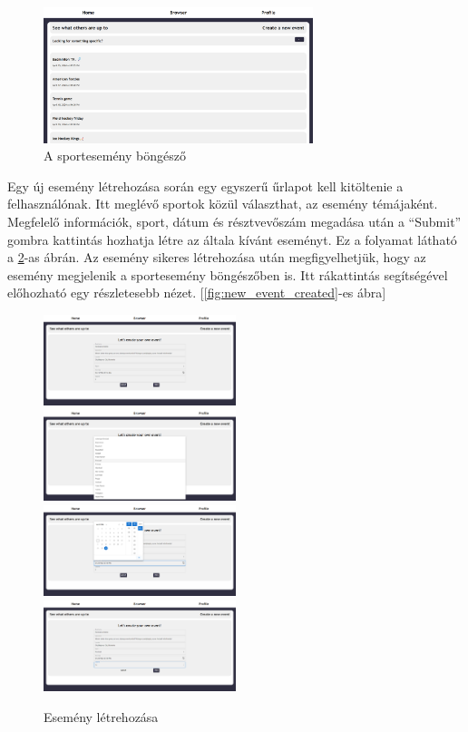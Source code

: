 \begin{figure}[ht]
	\centering
	\includegraphics[width=0.7\textwidth]{images/browser_page.png}
	\caption{A sportesemény böngésző}
	\label{fig:browser_page}
\end{figure}

Egy új esemény létrehozása során egy egyszerű űrlapot kell kitöltenie a felhasználónak. Itt meglévő sportok közül választhat, az esemény témájaként.
Megfelelő információk, sport, dátum és résztvevőszám megadása után a ``Submit'' gombra kattintás hozhatja létre az általa kívánt eseményt.
Ez a folyamat látható a \ref{fig:create_event}-as ábrán. Az esemény sikeres létrehozása után megfigyelhetjük, hogy az esemény megjelenik a sportesemény böngészőben is. Itt rákattintás segítségével előhozható
egy részletesebb nézet. [\ref{fig:new_event_created}-es ábra]

\begin{figure}[h]
	\includegraphics[width=0.5\textwidth]{images/create_event_1.png}
	\includegraphics[width=0.5\textwidth]{images/create_event_2.png}
	\includegraphics[width=0.5\textwidth]{images/create_event_3.png}
	\includegraphics[width=0.5\textwidth]{images/create_event_4.png}
	\caption{Esemény létrehozása}
	\label{fig:create_event}
\end{figure}

